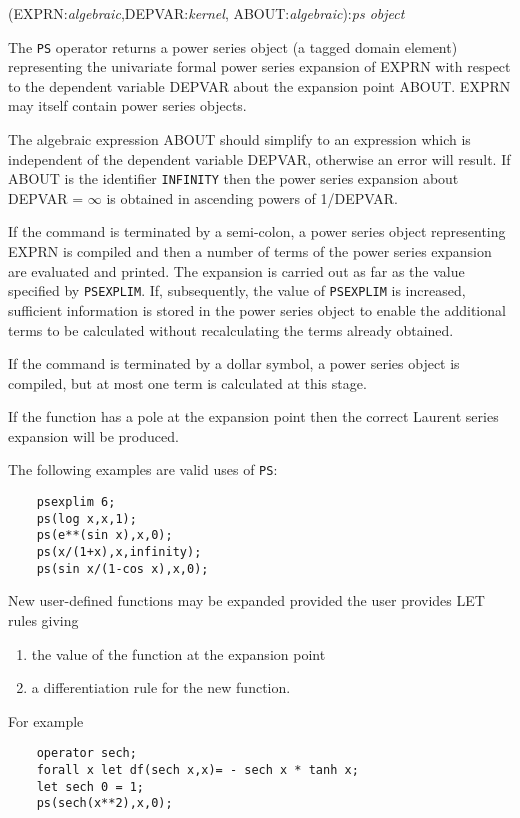 (EXPRN:{\em algebraic},DEPVAR:{\em kernel},
ABOUT:{\em algebraic}):{\em ps object}

The {\tt PS} operator returns a  power series object
(a tagged domain element)
representing the univariate formal power series expansion of EXPRN with
respect to the dependent variable DEPVAR about the expansion point
ABOUT.  EXPRN may itself contain power series objects.

The algebraic expression ABOUT should simplify to an expression
which is independent of the dependent variable DEPVAR, otherwise
an error will result.  If ABOUT is the identifier {\tt INFINITY}
then the power series expansion about DEPVAR = $\infty$ is
obtained in ascending powers of 1/DEPVAR.

If the command is terminated by a semi-colon, a power series object
representing EXPRN is compiled and then a number of terms of the
power series expansion are evaluated and printed.  The expansion is
carried out as far as the value specified by {\tt PSEXPLIM}.  If,
subsequently, the value of {\tt PSEXPLIM} is increased, sufficient
information is stored in the power series object to enable the
additional terms to be calculated without recalculating the terms
already obtained.

If the command is terminated by a dollar symbol, a power series object
is compiled, but at most one term is calculated at this stage.

If the function has a pole at the expansion point then the correct
Laurent series expansion will be produced.

\noindent The following examples are valid uses of {\tt PS}:
\begin{verbatim}
    psexplim 6;
    ps(log x,x,1);
    ps(e**(sin x),x,0);
    ps(x/(1+x),x,infinity);
    ps(sin x/(1-cos x),x,0);
\end{verbatim}

New user-defined functions may be expanded provided the user provides
LET rules giving

\begin{enumerate}
\item the value of the function at the expansion point
\item a differentiation rule for the new function.
\end{enumerate}

\noindent For example
\begin{verbatim}
    operator sech;
    forall x let df(sech x,x)= - sech x * tanh x;
    let sech 0 = 1;
    ps(sech(x**2),x,0);
\end{verbatim}

